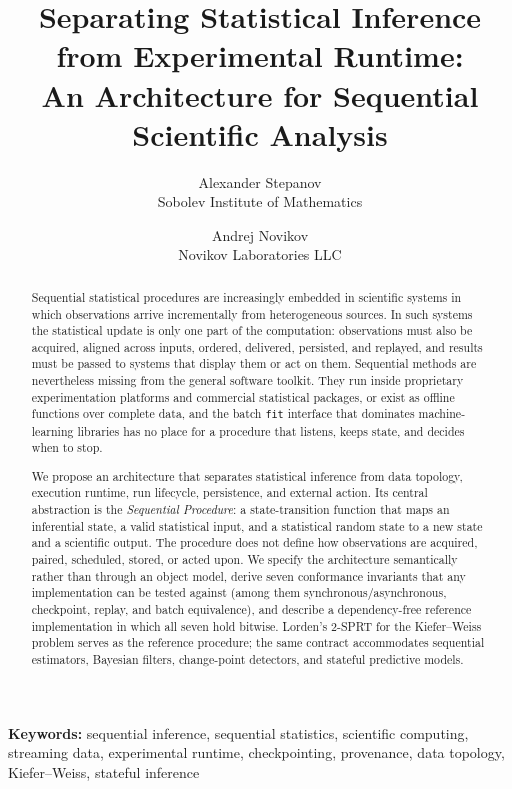\documentclass[11pt,a4paper]{article}
\title{
    Separating Statistical Inference from Experimental Runtime:\\
    An Architecture for Sequential Scientific Analysis
}
\author{
    Alexander Stepanov\\
    \small Sobolev Institute of Mathematics
    \and
    Andrej Novikov\\
    \small Novikov Laboratories LLC
}
\date{}
\theoremstyle{definition}
\theoremstyle{remark}
\newcommand{\code}[1]{\texttt{#1}}
\begin{document}
\maketitle

\begin{abstract}

Sequential statistical procedures are increasingly embedded in scientific
systems in which observations arrive incrementally from heterogeneous
sources. In such systems the statistical update is only one part of the
computation: observations must also be acquired, aligned across inputs,
ordered, delivered, persisted, and replayed, and results must be passed to
systems that display them or act on them. Sequential methods are
nevertheless missing from the general software toolkit. They run inside
proprietary experimentation platforms and commercial statistical
packages, or exist as offline functions over complete data, and the batch
\code{fit} interface that dominates machine-learning libraries has no
place for a procedure that listens, keeps state, and decides when to
stop.

We propose an architecture that separates statistical inference from data
topology, execution runtime, run lifecycle, persistence, and external
action. Its central abstraction is the \emph{Sequential Procedure}: a
state-transition function that maps an inferential state, a valid
statistical input, and a statistical random state to a new state and a
scientific output. The procedure does not define how observations are
acquired, paired, scheduled, stored, or acted upon. We specify the
architecture semantically rather than through an object model, derive
seven conformance invariants that any implementation can be tested
against (among them synchronous/asynchronous, checkpoint, replay, and
batch equivalence), and describe a dependency-free reference
implementation in which all seven hold bitwise. Lorden's 2-SPRT for the
Kiefer--Weiss problem serves as the reference procedure; the same
contract accommodates sequential estimators, Bayesian filters,
change-point detectors, and stateful predictive models.

\end{abstract}

\noindent
\textbf{Keywords:}
sequential inference,
sequential statistics,
scientific computing,
streaming data,
experimental runtime,
checkpointing,
provenance,
data topology,
Kiefer--Weiss,
stateful inference

\end{document}

